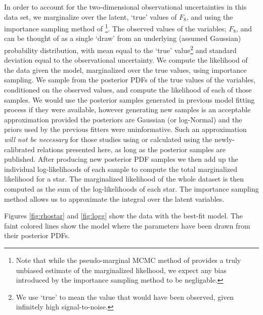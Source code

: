 In order to account for the two-dimensional observational uncertainties in
this data set, we marginalize over the latent, `true' values of $F_8$,
\rhostar and \logg using the importance sampling method of
\citep{hogg:2010}\footnote{Note that while the pseudo-marginal MCMC method of
\citep{andrieu:2009} provides a truly unbiased estimate of the marginalized
likelhood, we expect any bias introduced by the importance sampling method to
be negligable.}.
The observed values of the variables; $F_8$, \rhostar and \logg can be thought
of as a single `draw' from an underlying (assumed Gaussian) probability
distribution, with mean equal to the `true' value\footnote{We use `true' to
mean the value that would have been observed, given infinitely high
signal-to-noise.} and standard deviation equal to the observational
uncertainty.
We compute the likelihood of the data given the model, marginalized over the
true values, using importance sampling.
We sample from the posterior PDFs of the true values of the variables,
conditioned on the observed values, and compute the likelihood of each of those
samples.
We would use the posterior samples generated in previous model fitting process
if they were available, however generating new samples is an acceptable
approximation provided the posteriors are Gaussian (or log-Normal) and the
priors used by the previous fitters were uninformative.
Such an approximation {\it will not be necessary} for those studies using
\rhostar or \logg calculated using the newly-calibrated relations
presented here, as long as the posterior samples are published.
After producing new posterior PDF samples we then add up the individual
log-likelihoods of each sample to compute the total marginalized likelihood
for a star.
The marginalized likelihood of the whole dataset is then computed as the sum
of the log-likelihoods of each star.
The importance sampling method allows us to approximate the integral over the
latent variables.

Figures \ref{fig:rhostar} and \ref{fig:logg} show the data with the best-fit
model.
The faint colored lines show the model where the parameters have been drawn
from their posterior PDFs.

